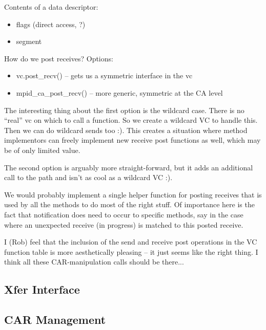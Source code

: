 \documentclass[11pt,letterpaper]{article}
\begin{document}
Contents of a data descriptor:
\begin{itemize}
\item flags (direct access, ?)
\item segment
\end{itemize}


How do we post receives?  Options:
\begin{itemize}
\item vc.post\_recv() -- gets us a symmetric interface in the vc
\item mpid\_ca\_post\_recv() -- more generic, symmetric at the CA level
\end{itemize}

The interesting thing about the first option is the wildcard case.  There is no
``real'' vc on which to call a function.  So we create a wildcard VC to handle
this.  Then we can do wildcard sends too :).  This creates a situation where
method implementors can freely implement new receive post functions as well,
which may be of only limited value.

The second option is arguably more straight-forward, but it adds an additional
call to the path and isn't as cool as a wildcard VC :).

%
%
We would probably implement a single helper function for posting receives that
is used by all the methods to do most of the right stuff.  Of importance here
is the fact that notification does need to occur to specific methods, say in
the case where an unexpected receive (in progress) is matched to this posted
receive.

I (Rob) feel that the inclusion of the send and receive post operations in the
VC function table is more aesthetically pleasing -- it just seems like the
right thing.  I think all these CAR-manipulation calls should be there...

%
%
\subsection{Xfer Interface}


\subsection{CAR Management}
\end{document}
